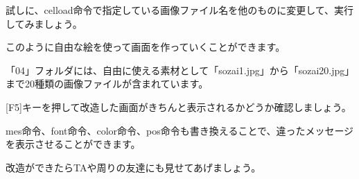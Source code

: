 試しに、celload命令で指定している画像ファイル名を他のものに変更して、実行してみましょう。

このように自由な絵を使って画面を作っていくことができます。


\begin{description}
    \item {}
\end{description}



「04」フォルダには、自由に使える素材として「sozai1.jpg」から「sozai20.jpg」まで20種類の画像ファイルが含まれています。

[F5]キーを押して改造した画面がきちんと表示されるかどうか確認しましょう。

mes命令、font命令、color命令、pos命令も書き換えることで、違ったメッセージを表示させることができます。

改造ができたらTAや周りの友達にも見せてあげましょう。









